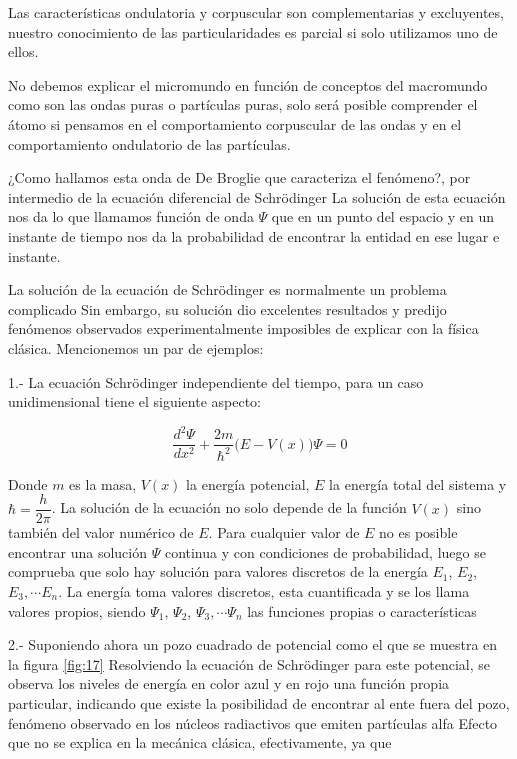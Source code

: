 Las características ondulatoria y corpuscular son complementarias y excluyentes, nuestro conocimiento de las particularidades es parcial si solo utilizamos uno de ellos. 

No debemos explicar el micromundo en función de conceptos del macromundo como son las ondas puras o partículas puras, solo será posible comprender el átomo si pensamos en el comportamiento corpuscular de las ondas y en el comportamiento ondulatorio de las partículas.

¿Como hallamos esta onda de De Broglie que caracteriza el fenómeno?, por intermedio de la ecuación
diferencial de Schrödinger La solución de esta ecuación nos da lo que llamamos función de onda $\Psi$  que en un punto del espacio y en un instante de tiempo nos da la probabilidad de encontrar la entidad en ese lugar e instante.

La solución de la ecuación de Schrödinger es normalmente un problema complicado Sin embargo, su solución dio excelentes resultados y predijo fenómenos observados experimentalmente imposibles de explicar con la física clásica. Mencionemos un par de ejemplos:

1.- La ecuación Schrödinger independiente del tiempo, para un caso unidimensional tiene el
siguiente aspecto:

\begin{equation}
	\dfrac{d^{2}\Psi}{dx^{2}} + \dfrac{2m}{\hbar^{2}}\big( E-V(x) \big)\Psi = 0
\end{equation}

Donde $m$ es la masa, $V(x)$ la energía potencial, $E$ la energía total del sistema y $\hbar=\dfrac{h}{2\pi}$. La solución de la ecuación no solo depende de la función $V(x)$ sino también del valor numérico de $E$. Para cualquier valor de $E$ no es posible encontrar una solución $\Psi$ continua y con condiciones de probabilidad, luego se comprueba que solo hay solución para valores discretos de la energía $E_{1}$, $E_{2}$, $E_{3}, \cdots E_{n}$. La energía toma valores discretos, esta
cuantificada y se los llama valores propios, siendo $\Psi_{1}$, $\Psi_{2}$, $\Psi_{3}, \cdots \Psi_{n}$ las funciones propias o características

2.- Suponiendo ahora un pozo cuadrado de potencial como el que se muestra en la figura \ref{fig:17}
Resolviendo la ecuación de Schrödinger para este potencial, se observa los niveles de energía en color
azul y en rojo una función propia particular, indicando que existe la posibilidad de encontrar al ente
fuera del pozo, fenómeno observado en los núcleos radiactivos que emiten partículas alfa Efecto que
no se explica en la mecánica clásica, efectivamente, ya que

